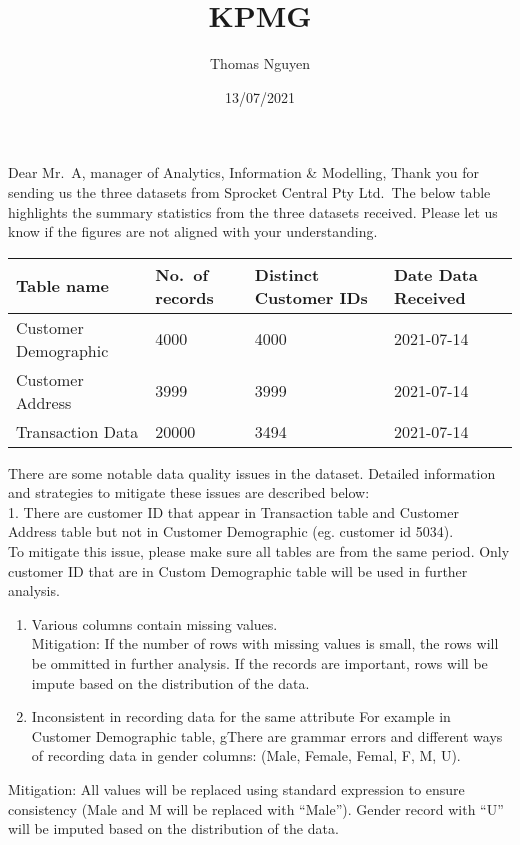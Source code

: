 \documentclass[
]{article}
\title{KPMG}
\author{Thomas Nguyen}
\date{13/07/2021}
\begin{document}
\maketitle

Dear Mr.~A, manager of Analytics, Information \& Modelling, Thank you
for sending us the three datasets from Sprocket Central Pty Ltd.~The
below table highlights the summary statistics from the three datasets
received. Please let us know if the figures are not aligned with your
understanding.

\begin{longtable}[]{@{}llll@{}}
\toprule
Table name & No.~of records & Distinct Customer IDs & Date Data
Received \\
\midrule
\endhead
Customer Demographic & 4000 & 4000 & 2021-07-14 \\
Customer Address & 3999 & 3999 & 2021-07-14 \\
Transaction Data & 20000 & 3494 & 2021-07-14 \\
\bottomrule
\end{longtable}

There are some notable data quality issues in the dataset. Detailed
information and strategies to mitigate these issues are described
below:\\
1. There are customer ID that appear in Transaction table and Customer
Address table but not in Customer Demographic (eg. customer id 5034).\\
To mitigate this issue, please make sure all tables are from the same
period. Only customer ID that are in Custom Demographic table will be
used in further analysis.

\begin{enumerate}
\def\labelenumi{\arabic{enumi}.}
\setcounter{enumi}{1}
\item
  Various columns contain missing values.\\
  Mitigation: If the number of rows with missing values is small, the
  rows will be ommitted in further analysis. If the records are
  important, rows will be impute based on the distribution of the data.
\item
  Inconsistent in recording data for the same attribute For example in
  Customer Demographic table, gThere are grammar errors and different
  ways of recording data in gender columns: (Male, Female, Femal, F, M,
  U).
\end{enumerate}

Mitigation: All values will be replaced using standard expression to
ensure consistency (Male and M will be replaced with ``Male''). Gender
record with ``U'' will be imputed based on the distribution of the data.
\end{document}
